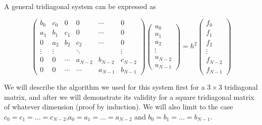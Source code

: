 \documentclass {article}
\begin{document}
A general tridiagonal system can be expressed as

\begin{equation}
 \begin{pmatrix}
   b_0 & c_0 &  0 & 0 & \cdots & 0  \\
  a_1 & b_1 & c_1 & 0 & \cdots & 0  \\
   0 & a_2 &  b_2 & c_2 & \cdots & 0 \\
  \vdots  & \vdots  & & \ddots & & \vdots   \\
   0 &  0 & \cdots  & a_{N-2} & b_{N-2} & c_{N-2} \\
   0 &  0 & \cdots & \cdots  & a_{N-1} & b_{N-1}
 \end{pmatrix}
 \begin{pmatrix}
  u_0 \\
  u_1 \\
  u_2 \\
  \vdots  \\
  u_{N-2} \\
  u_{N-1} 
 \end{pmatrix}
 =h^2
 \begin{pmatrix}
  f_0 \\
  f_1 \\
  f_2 \\
  \vdots  \\
  f_{N-2} \\
  f_{N-1} 
 \end{pmatrix}
\end{equation}

We will describe the algorithm we used for this system first for a $3\times3$ tridiagonal matrix, and after we will demonstrate its validity for a square tridiagonal matrix of whatever dimension (proof by induction). We will also limit to the case $c_0=c_1=...=c_{N-2}$,$a_0=a_1=...=a_{N-2}$ and $b_0=b_1=...=b_{N-1}$. 
\end{document}
